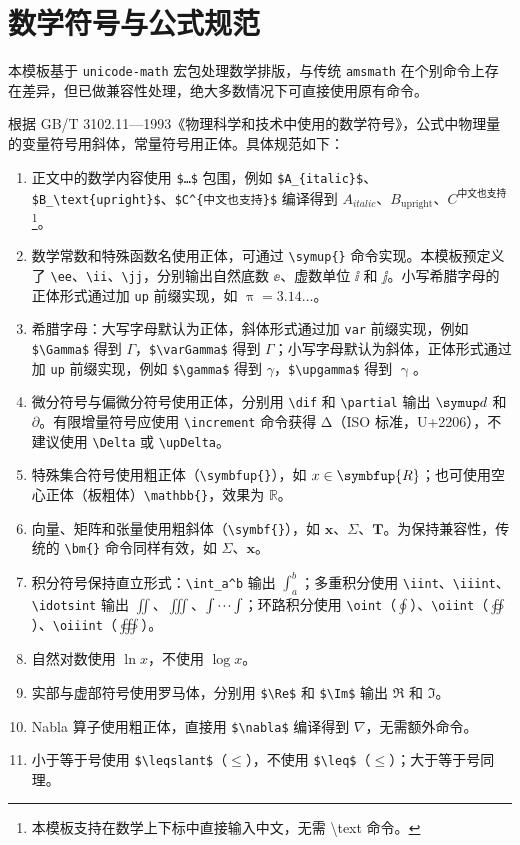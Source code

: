 \clearpage
\section{数学符号与公式规范}\label{equation}

本模板基于 \verb|unicode-math| 宏包处理数学排版，与传统 \verb|amsmath| 在个别命令上存在差异，但已做兼容性处理，绝大多数情况下可直接使用原有命令。

根据 GB/T 3102.11—1993《物理科学和技术中使用的数学符号》，公式中物理量的变量符号用斜体，常量符号用正体。具体规范如下：

\begin{enumerate}[kuohao]
  \item 正文中的数学内容使用 \verb|$…$| 包围，例如 \verb|$A_{italic}$|、\verb|$B_\text{upright}$|、\verb|$C^{中文也支持}$| 编译得到 $A_{italic}$、$B_\text{upright}$、$C^{中文也支持}$\footnote{本模板支持在数学上下标中直接输入中文，无需 \textbackslash text 命令。}。
  \item 数学常数和特殊函数名使用正体，可通过 \verb|\symup{}| 命令实现。本模板预定义了 \verb|\ee|、\verb|\ii|、\verb|\jj|，分别输出自然底数 $\ee$、虚数单位 $\ii$ 和 $\jj$。小写希腊字母的正体形式通过加 \verb|up| 前缀实现，如 $\uppi = 3.14\dots$。
  \item 希腊字母：大写字母默认为正体，斜体形式通过加 \verb|var| 前缀实现，例如 \verb|$\Gamma$| 得到 $\Gamma$，\verb|$\varGamma$| 得到 $\varGamma$；小写字母默认为斜体，正体形式通过加 \verb|up| 前缀实现，例如 \verb|$\gamma$| 得到 $\gamma$，\verb|$\upgamma$| 得到 $\upgamma$。
  \item 微分符号与偏微分符号使用正体，分别用 \verb|\dif| 和 \verb|\partial| 输出 $\dif$ 和 $\partial$。有限增量符号应使用 \verb|\increment| 命令获得 $\increment$（ISO 标准，U+2206），不建议使用 \verb|\Delta| 或 \verb|\upDelta|。
  \item 特殊集合符号使用粗正体（\verb|\symbfup{}|），如 $x\in\symbfup{R}$；也可使用空心正体（板粗体）\verb|\mathbb{}|，效果为 $\mathbb{R}$。
  \item 向量、矩阵和张量使用粗斜体（\verb|\symbf{}|），如 $\symbf{x}$、$\symbf{\varSigma}$、$\symbf{T}$。为保持兼容性，传统的 \verb|\bm{}| 命令同样有效，如 $\bm{\varSigma}$、$\bm{x}$。
  \item 积分符号保持直立形式：\verb|\int_a^b| 输出 $\int_a^b$；多重积分使用 \verb|\iint|、\verb|\iiint|、\verb|\idotsint| 输出 $\iint$、$\iiint$、$\idotsint$；环路积分使用 \verb|\oint|（$\oint$）、\verb|\oiint|（$\oiint$）、\verb|\oiiint|（$\oiiint$）。
  \item 自然对数使用 $\ln x$，不使用 $\log x$。
  \item 实部与虚部符号使用罗马体，分别用 \verb|$\Re$| 和 \verb|$\Im$| 输出 $\Re$ 和 $\Im$。
  \item Nabla 算子使用粗正体，直接用 \verb|$\nabla$| 编译得到 $\nabla$，无需额外命令。
  \item 小于等于号使用 \verb|$\leqslant$|（$\leqslant$），不使用 \verb|$\leq$|（$\leq$）；大于等于号同理。
\end{enumerate}